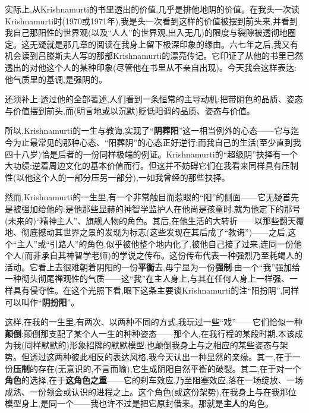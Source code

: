 实际上,从Krishnamurti的书里透出的价值,几乎是排他地阴的价值。在我头一次读Krishnamurti时(1970或1971年),我是头一次看到这样的价值被摆到前头来,并看到我自己那阳性的世界观(以及“人人”的世界观,出入无几)的限度与裂隙被透彻地圈定。这无疑就是那几章的阅读在我身上留下极深印象的缘由。六七年之后,我又有机会读到吕滕斯夫人写的那部Krishnamurti的漂亮传记。它印证了从他的书里已然透出的对他这个人的某种印象(尽管他在书里从不亲自出现)。今天我会这样表达:他气质里的基调,是\dmark{}强阴的。

还须补上:透过他的全部著述,人们看到一条恒常的主导动机:把带阴色的品质、姿态与价值摆到前头,而(明言地或以沉默)贬低阳调的品质、姿态与价值。

所以,Krishnamurti的一生与教诲,实现了“\textbf{阴葬阳}”这一相当例外的心态——它与迄今为止最常见的那种心态、“阳葬阴”的心态正好逆行;而我自己的生活(至少直到我四十八岁)恰是后者的一份同样极端的例证。Krishnamurti的“超级阴”抉择有一个大功绩:逆着周边文化的基本价值而行。但这并不妨碍它们在我看来同样具有压制性(以他这个人的一部分压另一部分),一如我曾经的那些抉择。

然而,Krishnamurti的一生里,有一个非常触目而惹眼的“阳”的侧面——它无疑首先是被强加给他的:是他那些显赫的神智学监护人在他尚是孩童时,就为他定下的那号(未来的)“精神主人”、旗舰人物的角色。其后,在他生活的大转折——以那些翻天覆地、彻底撼动其世界之景的发现为标志(这些发现在其后成了“教诲”)——之后,这个“主人”或“引路人”的角色,似乎被他整个地内化了,被他自己接了过来,连同一份他个人(而非承自其神智学老师)的学说之传布。这份传布代表一种强烈乃至耗竭人的活动。它看上去很难朝着阴阳的一份\textbf{平衡}去,毋宁显为一份\textbf{强制}:由一个“我”强加给一种彻头彻尾禅观性的气质——这“我”在主人身上,与其在任何人身上一样强、一样具有侵夺性。在这个光照下看,眼下这条主要谈Krishnamurti的注“阳扮阴”,同样可以叫作“\textbf{阴扮阳}”。

这样,在我的一生里,有两次、以两种不同的方式,我玩过一些“戏”——它们恰似一种\textbf{颠倒}:颠倒那支配了某个人一生的种种姿态——那个人,在我行程的某段时期,本该成为我(同样默默的)形象招牌的默默模型;也颠倒我身上与之相应的某些姿态与架势。但透过这两种彼此相反的表达风格,我今天认出一种显然的亲缘。其一,在于一份\textbf{压制}的存在(无意识的,不言而喻),它\dmark{}生成阴阳自然平衡的破裂。其二,在于对一个\textbf{角色}的选择,在于\textbf{这角色之重}——它的刹车效应,乃至阻塞效应,落在一场绽放、一场成熟、一份领会或认识的进程之上。这个角色(或这份架势),在我身上与在我那位模型身上,是同一个——我也许不过是把它原封借来。那就是\textbf{主人}的角色。


